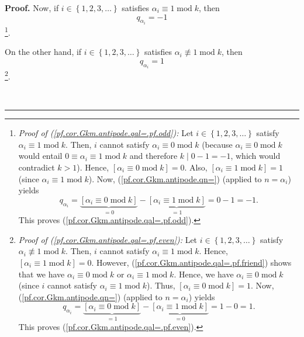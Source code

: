 \documentclass[numbers=enddot,12pt,final,onecolumn,notitlepage]{scrartcl}%
\theoremstyle{definition}
\newenvironment{proof}[1][Proof]{\noindent\textbf{#1.} }{\ \rule{0.5em}{0.5em}}
\newenvironment{verlong}{}{}
\begin{document}
\begin{proof}
\begin{verlong}
Now, if $i\in\left\{  1,2,3,\ldots\right\}  $ satisfies $\alpha_{i}%
\equiv1\operatorname{mod}k$, then%
\begin{equation}
q_{\alpha_{i}}=-1 \label{pf.cor.Gkm.antipode.qal=.pf.odd}%
\end{equation}
\footnote{\textit{Proof of (\ref{pf.cor.Gkm.antipode.qal=.pf.odd}):} Let
$i\in\left\{  1,2,3,\ldots\right\}  $ satisfy $\alpha_{i}\equiv
1\operatorname{mod}k$. Then, $i$ cannot satisfy $\alpha_{i}\equiv
0\operatorname{mod}k$ (because $\alpha_{i}\equiv0\operatorname{mod}k$ would
entail $0\equiv\alpha_{i}\equiv1\operatorname{mod}k$ and therefore
$k\mid0-1=-1$, which would contradict $k>1$). Hence, $\left[  \alpha_{i}%
\equiv0\operatorname{mod}k\right]  =0$. Also, $\left[  \alpha_{i}%
\equiv1\operatorname{mod}k\right]  =1$ (since $\alpha_{i}\equiv
1\operatorname{mod}k$). Now, (\ref{pf.cor.Gkm.antipode.qn=}) (applied to
$n=\alpha_{i}$) yields%
\[
q_{\alpha_{i}}=\underbrace{\left[  \alpha_{i}\equiv0\operatorname{mod}%
k\right]  }_{=0}-\underbrace{\left[  \alpha_{i}\equiv1\operatorname{mod}%
k\right]  }_{=1}=0-1=-1.
\]
This proves (\ref{pf.cor.Gkm.antipode.qal=.pf.odd}).}.

On the other hand, if $i\in\left\{  1,2,3,\ldots\right\}  $ satisfies
$\alpha_{i}\not \equiv 1\operatorname{mod}k$, then%
\begin{equation}
q_{\alpha_{i}}=1 \label{pf.cor.Gkm.antipode.qal=.pf.even}%
\end{equation}
\footnote{\textit{Proof of (\ref{pf.cor.Gkm.antipode.qal=.pf.even}):} Let
$i\in\left\{  1,2,3,\ldots\right\}  $ satisfy $\alpha_{i}\not \equiv
1\operatorname{mod}k$. Then, $i$ cannot satisfy $\alpha_{i}\equiv
1\operatorname{mod}k$. Hence, $\left[  \alpha_{i}\equiv1\operatorname{mod}%
k\right]  =0$. However, (\ref{pf.cor.Gkm.antipode.qal=.pf.friend}) shows that
we have $\alpha_{i}\equiv0\operatorname{mod}k$ or $\alpha_{i}\equiv
1\operatorname{mod}k$. Hence, we have $\alpha_{i}\equiv0\operatorname{mod}k$
(since $i$ cannot satisfy $\alpha_{i}\equiv1\operatorname{mod}k$). Thus,
$\left[  \alpha_{i}\equiv0\operatorname{mod}k\right]  =1$. Now,
(\ref{pf.cor.Gkm.antipode.qn=}) (applied to $n=\alpha_{i}$) yields%
\[
q_{\alpha_{i}}=\underbrace{\left[  \alpha_{i}\equiv0\operatorname{mod}%
k\right]  }_{=1}-\underbrace{\left[  \alpha_{i}\equiv1\operatorname{mod}%
k\right]  }_{=0}=1-0=1.
\]
This proves (\ref{pf.cor.Gkm.antipode.qal=.pf.even}).}.


\end{verlong}
\end{proof}
\end{document}
